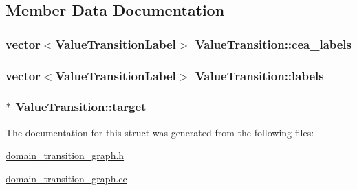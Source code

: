 \subsection{Member Data Documentation}
\hypertarget{structValueTransition_a93dd5ccafcfda281a6cf439c5bfe9210}{
\subsubsection[{cea\-\_\-labels}]{\setlength{\rightskip}{0pt plus 5cm}vector$<${\bf Value\-Transition\-Label}$>$ Value\-Transition\-::cea\-\_\-labels}}\label{structValueTransition_a93dd5ccafcfda281a6cf439c5bfe9210}
\hypertarget{structValueTransition_a121550fd39a225636613d0da38979381}{
\subsubsection[{labels}]{\setlength{\rightskip}{0pt plus 5cm}vector$<${\bf Value\-Transition\-Label}$>$ Value\-Transition\-::labels}}\label{structValueTransition_a121550fd39a225636613d0da38979381}
\hypertarget{structValueTransition_a7c99b8c882250f8eb55d7713338a82e1}{
\subsubsection[{target}]{$\ast$ Value\-Transition\-::target}}\label{structValueTransition_a7c99b8c882250f8eb55d7713338a82e1}


The documentation for this struct was generated from the following files\-:\begin{DoxyCompactItemize}
\item 
\hyperlink{domain__transition__graph_8h}{domain\-\_\-transition\-\_\-graph.\-h}\item 
\hyperlink{domain__transition__graph_8cc}{domain\-\_\-transition\-\_\-graph.\-cc}\end{DoxyCompactItemize}
